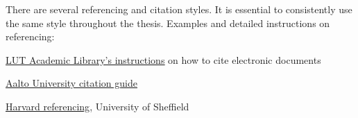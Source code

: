 There are several referencing and citation styles. It is essential to consistently use the same style throughout the thesis. Examples and detailed instructions on referencing:

\href{https://libguides.lut.fi/citingelectronicdocuments}{\color{blue} \underline{LUT Academic Library’s instructions}} on how to cite electronic documents

\href{https://libguides.aalto.fi/citation_guide}{\color{blue} \underline{Aalto University citation guide}}

\href{https://www.librarydevelopment.group.shef.ac.uk/referencing/harvard.html}{\color{blue} \underline{Harvard referencing}}, University of Sheffield 